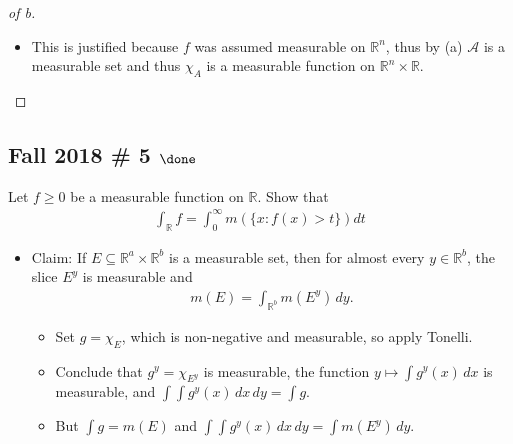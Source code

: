 \begin{solution}
\begin{proof}[of b]
\begin{itemize}
  \begin{itemize}
  \tightlist
  \item
    This is justified because \(f\) was assumed measurable on
    \({\mathbb{R}}^n\), thus by (a) \(\mathcal{A}\) is a measurable set
    and thus \(\chi_A\) is a measurable function on
    \({\mathbb{R}}^n\times{\mathbb{R}}\).
  \end{itemize}
\end{itemize}

\end{proof}

\end{solution}

\hypertarget{fall-2018-5-done}{%
\subsection{\texorpdfstring{Fall 2018 \# 5
\(\done\)}{Fall 2018 \# 5 \textbackslash done}}\label{fall-2018-5-done}}

Let \(f \geq 0\) be a measurable function on \({\mathbb{R}}\). Show that
\begin{align*}
\int _{{\mathbb{R}}} f = \int _{0}^{\infty} m(\{x: f(x)>t\}) dt
\end{align*}

\begin{concept}

\envlist

\begin{itemize}
\tightlist
\item
  Claim: If \(E\subseteq {\mathbb{R}}^a \times{\mathbb{R}}^b\) is a
  measurable set, then for almost every \(y\in {\mathbb{R}}^b\), the
  slice \(E^y\) is measurable and
  \begin{align*}
  m(E) = \int_{{\mathbb{R}}^b} m(E^y) \,dy
  .\end{align*}

  \begin{itemize}
  \tightlist
  \item
    Set \(g = \chi_E\), which is non-negative and measurable, so apply
    Tonelli.
  \item
    Conclude that \(g^y = \chi_{E^y}\) is measurable, the function
    \(y\mapsto \int g^y(x)\, dx\) is measurable, and
    \(\int \int g^y(x)\,dx \,dy = \int g\).
  \item
    But \(\int g = m(E)\) and
    \(\int\int g^y(x) \,dx\,dy = \int m(E^y)\,dy\).
  \end{itemize}
\end{itemize}

\end{concept}

